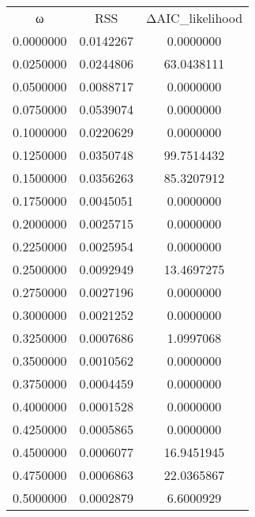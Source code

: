 \begin{tabular}{ccc}
ω & RSS & ΔAIC_likelihood\\
0.0000000 & 0.0142267 & 0.0000000\\
0.0250000 & 0.0244806 & 63.0438111\\
0.0500000 & 0.0088717 & 0.0000000\\
0.0750000 & 0.0539074 & 0.0000000\\
0.1000000 & 0.0220629 & 0.0000000\\
0.1250000 & 0.0350748 & 99.7514432\\
0.1500000 & 0.0356263 & 85.3207912\\
0.1750000 & 0.0045051 & 0.0000000\\
0.2000000 & 0.0025715 & 0.0000000\\
0.2250000 & 0.0025954 & 0.0000000\\
0.2500000 & 0.0092949 & 13.4697275\\
0.2750000 & 0.0027196 & 0.0000000\\
0.3000000 & 0.0021252 & 0.0000000\\
0.3250000 & 0.0007686 & 1.0997068\\
0.3500000 & 0.0010562 & 0.0000000\\
0.3750000 & 0.0004459 & 0.0000000\\
0.4000000 & 0.0001528 & 0.0000000\\
0.4250000 & 0.0005865 & 0.0000000\\
0.4500000 & 0.0006077 & 16.9451945\\
0.4750000 & 0.0006863 & 22.0365867\\
0.5000000 & 0.0002879 & 6.6000929\\
\end{tabular}
